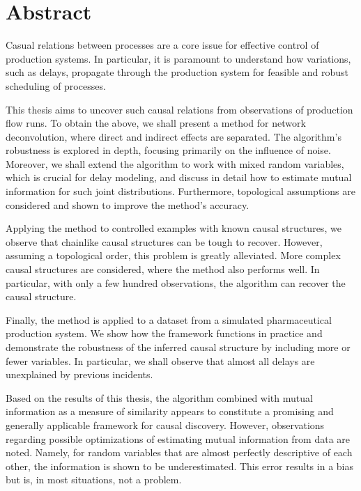 \chapter{Abstract}


Casual relations between processes are a core issue for effective control of production systems. In particular, it is paramount to understand how variations, such as delays, propagate through the production system for feasible and robust scheduling of processes.

This thesis aims to uncover such causal relations from observations of production flow runs. To obtain the above, we shall present a method for network deconvolution, where direct and indirect effects are separated. The algorithm's robustness is explored in depth, focusing primarily on the influence of noise. Moreover, we shall extend the algorithm to work with mixed random variables, which is crucial for delay modeling, and discuss in detail how to estimate mutual information for such joint distributions. Furthermore, topological assumptions are considered and shown to improve the method's accuracy.

Applying the method to controlled examples with known causal structures, we observe that chainlike causal structures can be tough to recover. However, assuming a topological order, this problem is greatly alleviated. More complex causal structures are considered, where the method also performs well. In particular, with only a few hundred observations, the algorithm can recover the causal structure.

Finally, the method is applied to a dataset from a simulated pharmaceutical production system. We show how the framework functions in practice and demonstrate the robustness of the inferred causal structure by including more or fewer variables. In particular, we shall observe that almost all delays are unexplained by previous incidents.

Based on the results of this thesis, the algorithm combined with mutual information as a measure of similarity appears to constitute a promising and generally applicable framework for causal discovery. However, observations regarding possible optimizations of estimating mutual information from data are noted. Namely, for random variables that are almost perfectly descriptive of each other, the information is shown to be underestimated. This error results in a bias but is, in most situations, not a problem.




